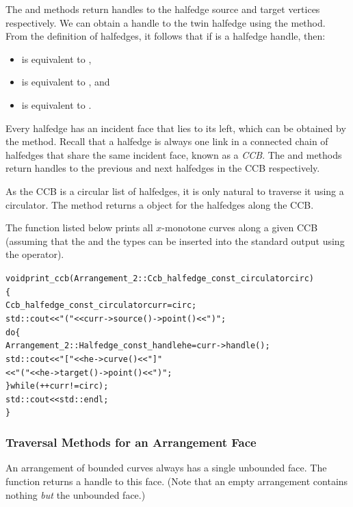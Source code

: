 The  and  methods return handles to
the halfedge source and target vertices respectively. We can
obtain a handle to the twin halfedge using the 
method. From the definition of halfedges, it follows that if
 is a halfedge handle, then:
\begin{itemize}
\item {} is equivalent to ,
\item {} is equivalent to , and
\item {} is equivalent to .
\end{itemize}

Every halfedge has an incident face that lies to its left, which
can be obtained by the  method. Recall that a
halfedge is always one link in a connected chain of halfedges that
share the same incident face, known as a {\em CCB}. The
 and  methods return handles to the
previous and next halfedges in the CCB respectively. 

As the CCB is a circular list of halfedges, it is only natural to 
traverse it using a circulator. The  method returns a 
 object for the
halfedges along the CCB.

The function  listed below prints all $x$-monotone
curves along a given CCB (assuming that the  and the
 types can be inserted into the standard output
using the \ccc{<<} operator).
\begin{alltt}
void print_ccb (Arrangement_2::Ccb_halfedge_const_circulator circ)
\{
  Ccb_halfedge_const_circulator curr = circ;
  std::cout << "(" << curr->source()->point() << ")";
  do \{
    Arrangement_2::Halfedge_const_handle he = curr->handle();
    std::cout << "   [" << he->curve() << "]   "
              << "(" << he->target()->point() << ")";
  \} while (++curr != circ);
  std::cout << std::endl;
\}
\end{alltt}

\subsubsection{Traversal Methods for an Arrangement Face}
\label{arr_sssec:tr_face}
%
An arrangement of bounded curves always has a single unbounded face.
The function  returns a handle to this face.
(Note that an empty arrangement contains nothing {\em but} the
unbounded face.)

